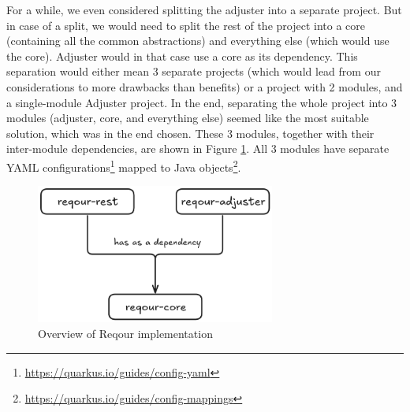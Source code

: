 \documentclass[../main.tex]{subfiles}
\begin{document}
For a while, we even considered splitting the adjuster into a separate project. But in case of a split, we would need to split the rest of the project into a core (containing all the common abstractions) and everything else (which would use the core). Adjuster would in that case use a core as its dependency. This separation would either mean 3 separate projects (which would lead from our considerations to more drawbacks than benefits) or a project with 2 modules, and a single-module Adjuster project. In the end, separating the whole project into 3 modules (adjuster, core, and everything else) seemed like the most suitable solution, which was in the end chosen. These 3 modules, together with their inter-module dependencies, are shown in Figure \ref{fig:reqour-modules}. All 3 modules have separate YAML configurations\footnote{\url{https://quarkus.io/guides/config-yaml}} mapped to Java objects\footnote{\url{https://quarkus.io/guides/config-mappings}}.

\begin{figure}
  \begin{center}
    \includegraphics[width=0.7\textwidth]{images/reqour-modules.png}
  \end{center}
  \caption{Overview of Reqour implementation}
  \label{fig:reqour-modules}
\end{figure}
\end{document}

